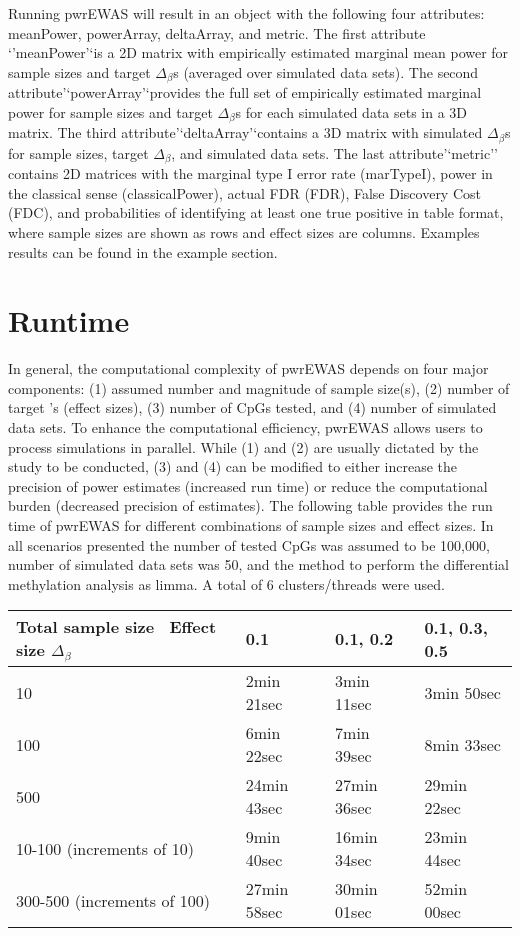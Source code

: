\documentclass[]{article}
\begin{document}
Running pwrEWAS will result in an object with the following four
attributes: meanPower, powerArray, deltaArray, and metric. The first
attribute `'meanPower'`is a 2D matrix with empirically estimated
marginal mean power for sample sizes and target \(\Delta_\beta\)s
(averaged over simulated data sets). The second
attribute'`powerArray'`provides the full set of empirically estimated
marginal power for sample sizes and target \(\Delta_\beta\)s for each
simulated data sets in a 3D matrix. The third
attribute'`deltaArray'`contains a 3D matrix with simulated
\(\Delta_\beta\)s for sample sizes, target \(\Delta_\beta\), and
simulated data sets. The last attribute'`metric'' contains 2D matrices
with the marginal type I error rate (marTypeI), power in the classical
sense (classicalPower), actual FDR (FDR), False Discovery Cost (FDC),
and probabilities of identifying at least one true positive in table
format, where sample sizes are shown as rows and effect sizes are
columns. Examples results can be found in the example section.

\section{Runtime}\label{runtime}

In general, the computational complexity of pwrEWAS depends on four
major components: (1) assumed number and magnitude of sample size(s),
(2) number of target 's (effect sizes), (3) number of CpGs tested, and
(4) number of simulated data sets. To enhance the computational
efficiency, pwrEWAS allows users to process simulations in parallel.
While (1) and (2) are usually dictated by the study to be conducted, (3)
and (4) can be modified to either increase the precision of power
estimates (increased run time) or reduce the computational burden
(decreased precision of estimates). The following table provides the run
time of pwrEWAS for different combinations of sample sizes and effect
sizes. In all scenarios presented the number of tested CpGs was assumed
to be 100,000, number of simulated data sets was 50, and the method to
perform the differential methylation analysis as limma. A total of 6
clusters/threads were used.

\begin{longtable}[]{@{}llll@{}}
\toprule
Total sample size ~Effect size \(\Delta_\beta\) & 0.1 & 0.1, 0.2 & 0.1,
0.3, 0.5\tabularnewline
\midrule
\endhead
10 & 2min 21sec & 3min 11sec & 3min 50sec\tabularnewline
100 & 6min 22sec & 7min 39sec & 8min 33sec\tabularnewline
500 & 24min 43sec & 27min 36sec & 29min 22sec\tabularnewline
10-100 (increments of 10) & 9min 40sec & 16min 34sec & 23min
44sec\tabularnewline
300-500 (increments of 100) & 27min 58sec & 30min 01sec & 52min
00sec\tabularnewline
\bottomrule
\end{longtable}
\end{document}
